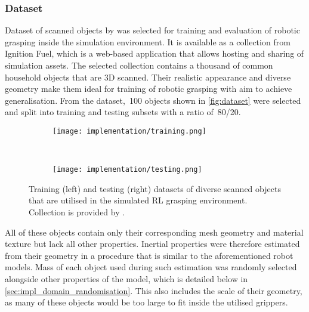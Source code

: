 \subsubsection{Dataset}

Dataset of scanned objects by \citet{googleresearch_google_2020} was selected for training and evaluation of robotic grasping inside the simulation environment. It is available as a collection from Ignition Fuel, which is a web-based application that allows hosting and sharing of simulation assets. The selected collection contains a thousand of common household objects that are 3D scanned. Their realistic appearance and diverse geometry make them ideal for training of robotic grasping with aim to achieve generalisation. From the dataset,~100 objects shown in \autoref{fig:dataset} were selected and split into training and testing subsets with a ratio of~80/20.

\begin{figure}[ht]
    \centering
    \begin{subfigure}[ht]{0.792\textwidth}
        \begin{flushleft}%
            \texttt{[image: implementation/training.png]}
        \end{flushleft}%
    \end{subfigure}%
    \vrule~%
    \begin{subfigure}[ht]{0.198\textwidth}
        \begin{flushright}%
            \texttt{[image: implementation/testing.png]}
        \end{flushright}%
    \end{subfigure}%
    \caption{Training (left) and testing (right) datasets of diverse scanned objects that are utilised in the simulated RL grasping environment. Collection is provided by \citet{googleresearch_google_2020}.}
    \label{fig:dataset}
\end{figure}

All of these objects contain only their corresponding mesh geometry and material texture but lack all other properties. Inertial properties were therefore estimated from their geometry in a procedure that is similar to the aforementioned robot models. Mass of each object used during such estimation was randomly selected alongside other properties of the model, which is detailed below in \autoref{sec:impl_domain_randomisation}. This also includes the scale of their geometry, as many of these objects would be too large to fit inside the utilised grippers.

